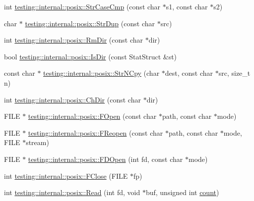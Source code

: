 \begin{DoxyCompactItemize}
\item 
int \mbox{\hyperlink{namespacetesting_1_1internal_1_1posix_a1ef2385a7f8e4c706054da35967e76bd}{testing\+::internal\+::posix\+::\+Str\+Case\+Cmp}} (const char $\ast$s1, const char $\ast$s2)
\item 
char $\ast$ \mbox{\hyperlink{namespacetesting_1_1internal_1_1posix_a8e352884793a65ae8be144676f1a9136}{testing\+::internal\+::posix\+::\+Str\+Dup}} (const char $\ast$src)
\item 
int \mbox{\hyperlink{namespacetesting_1_1internal_1_1posix_acbad5d4ea5b73fd1765f5f760642932a}{testing\+::internal\+::posix\+::\+Rm\+Dir}} (const char $\ast$dir)
\item 
bool \mbox{\hyperlink{namespacetesting_1_1internal_1_1posix_af0d04ed5baeed28353fa38742748a421}{testing\+::internal\+::posix\+::\+Is\+Dir}} (const Stat\+Struct \&st)
\item 
const char $\ast$ \mbox{\hyperlink{namespacetesting_1_1internal_1_1posix_a36fca815713332e5c6dc92c98b6b2574}{testing\+::internal\+::posix\+::\+Str\+N\+Cpy}} (char $\ast$dest, const char $\ast$src, size\+\_\+t n)
\item 
int \mbox{\hyperlink{namespacetesting_1_1internal_1_1posix_a1ddc8a4fc6bb21da372307485591a212}{testing\+::internal\+::posix\+::\+Ch\+Dir}} (const char $\ast$dir)
\item 
F\+I\+LE $\ast$ \mbox{\hyperlink{namespacetesting_1_1internal_1_1posix_a4042201dcc4932641d484e7ddf94de7d}{testing\+::internal\+::posix\+::\+F\+Open}} (const char $\ast$path, const char $\ast$mode)
\item 
F\+I\+LE $\ast$ \mbox{\hyperlink{namespacetesting_1_1internal_1_1posix_a9ef6d089cdae03f9d9e0e6d379c40703}{testing\+::internal\+::posix\+::\+F\+Reopen}} (const char $\ast$path, const char $\ast$mode, F\+I\+LE $\ast$stream)
\item 
F\+I\+LE $\ast$ \mbox{\hyperlink{namespacetesting_1_1internal_1_1posix_af7c268eba32d5a718b36b6b3801302e0}{testing\+::internal\+::posix\+::\+F\+D\+Open}} (int fd, const char $\ast$mode)
\item 
int \mbox{\hyperlink{namespacetesting_1_1internal_1_1posix_af4beeaaa8d62916d5e3b644a1ddfbd6b}{testing\+::internal\+::posix\+::\+F\+Close}} (F\+I\+LE $\ast$fp)
\item 
int \mbox{\hyperlink{namespacetesting_1_1internal_1_1posix_a3c6ab13e581a56f1b02f3eb7536c97fd}{testing\+::internal\+::posix\+::\+Read}} (int fd, void $\ast$buf, unsigned int \mbox{\hyperlink{gmock__stress__test_8cc_afd9db40e3361ae09188795e8cbe19752}{count}})
\item 

\end{DoxyCompactItemize}
